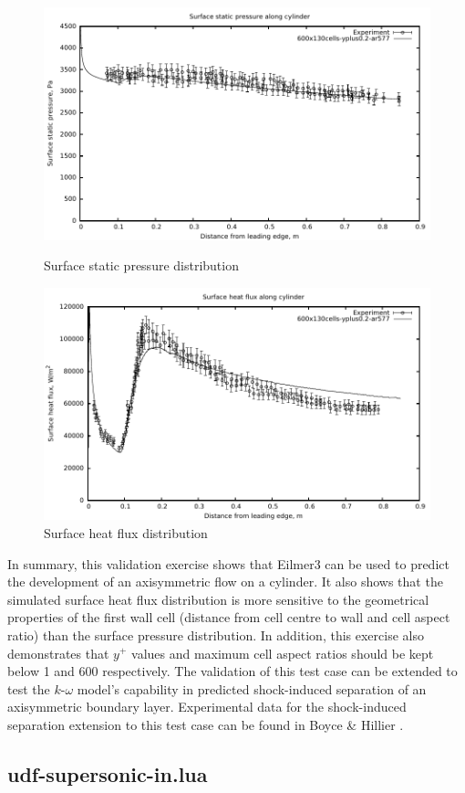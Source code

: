 \begin{figure}[h]
 \begin{center}
  \includegraphics[width=15cm]{./chap3-mallinson-cylinder/figs/final-pressure.pdf}
 \end{center}
 \caption{Surface static pressure distribution}
 \label{cylinder-surface-static-pressure}
\vspace{2cm}
 \begin{center}
  \includegraphics[width=15cm]{./chap3-mallinson-cylinder/figs/final-heat-flux.pdf}
 \end{center}
 \caption{Surface heat flux distribution}
 \label{cylinder-surface-heat-flux}
\end{figure}

In summary, this validation exercise shows that Eilmer3 can be used to predict the
development of an axisymmetric flow on a cylinder. It also shows that the simulated
surface heat flux distribution is more sensitive to the geometrical properties of
the first wall cell (distance from cell centre to wall and cell aspect ratio) than 
the surface pressure distribution. In addition, this exercise also demonstrates that
$y^+$ values and maximum cell aspect ratios should be kept below 1 and 600 respectively. 
The validation of this test case can be extended to test the $k$-$\omega$ model's 
capability in predicted shock-induced separation of an axisymmetric boundary layer. 
Experimental data for the shock-induced separation extension to this test case can be 
found in Boyce \& Hillier \cite{Boyce2000}.

\subsection{udf-supersonic-in.lua}
\label{section-udf-supersonic-in-lua}
\topbar

\bottombar
